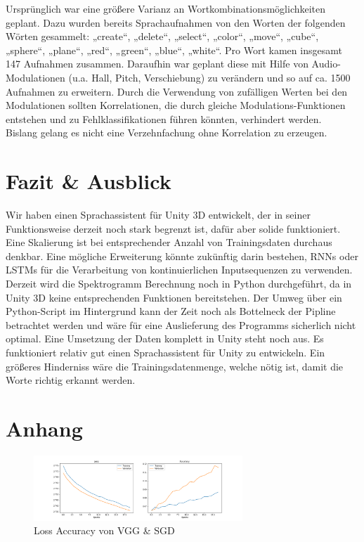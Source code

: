 \documentclass[sigconf]{acmart}
\begin{document}
Ursprünglich war eine größere Varianz an Wortkombinationsmöglichkeiten geplant. Dazu wurden bereits Sprachaufnahmen von den Worten der folgenden Wörten gesammelt: 
\newline
\newline
„create“, „delete“, „select“, „color“, „move“, „cube“, „sphere“, „plane“, „red“, „green“, „blue“, „white“. 
\newline
\newline
Pro Wort kamen insgesamt 147 Aufnahmen zusammen. Daraufhin war geplant diese mit Hilfe von Audio-Modulationen (u.a. Hall, Pitch, Verschiebung) zu verändern und so auf ca. 1500 Aufnahmen zu erweitern. Durch die Verwendung von zufälligen Werten bei den Modulationen sollten Korrelationen, die durch gleiche Modulations-Funktionen entstehen und zu Fehlklassifikationen führen könnten, verhindert werden.\\
Bislang gelang es nicht eine Verzehnfachung ohne Korrelation zu erzeugen.

\section{Fazit \& Ausblick}
Wir haben einen Sprachassistent für Unity 3D entwickelt, der in seiner Funktionsweise derzeit noch stark begrenzt ist, dafür aber solide funktioniert. Eine Skalierung ist bei entsprechender Anzahl von Trainingsdaten durchaus denkbar. Eine mögliche Erweiterung könnte zukünftig darin bestehen, RNNs oder LSTMs für die Verarbeitung von kontinuierlichen Inputsequenzen zu verwenden.
\newline
\newline
Derzeit wird die Spektrogramm Berechnung noch in Python durchgeführt, da in Unity 3D keine entsprechenden Funktionen bereitstehen. Der Umweg über ein Python-Script im Hintergrund kann der Zeit noch als Bottelneck der Pipline betrachtet werden und wäre für eine Auslieferung des Programms sicherlich nicht optimal. Eine Umsetzung der Daten komplett in Unity steht noch aus. 
\newline
\newline
Es funktioniert relativ gut einen Sprachassistent für Unity zu entwickeln. Ein größeres Hinderniss wäre die Trainingsdatenmenge, welche nötig ist, damit die Worte richtig erkannt werden. 




\newpage
\onecolumn
\appendix
\section{Anhang}
\label{section:Anhang}
\begin{figure}[H]
  \includegraphics[width=0.7\textwidth]{images/Loss_Acc_VGG_SGD}
  \caption{Loss Accuracy von VGG \& SGD}
  \Description{}
  \label{fig:VGG_SGD}
\end{figure} 
\end{document}
